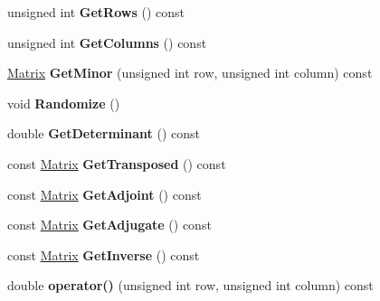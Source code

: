 \begin{DoxyCompactItemize}
\item 
\hypertarget{classdfv_1_1Matrix_a348f25a5ba52132128db9bd21d9edf7d}{unsigned int {\bfseries \-Get\-Rows} () const }\label{classdfv_1_1Matrix_a348f25a5ba52132128db9bd21d9edf7d}

\item 
\hypertarget{classdfv_1_1Matrix_aaf40c723521a5c12c87e238eedef22da}{unsigned int {\bfseries \-Get\-Columns} () const }\label{classdfv_1_1Matrix_aaf40c723521a5c12c87e238eedef22da}

\item 
\hypertarget{classdfv_1_1Matrix_a6d41ded1233ab2445bfac075fdddf831}{\hyperlink{classdfv_1_1Matrix}{\-Matrix} {\bfseries \-Get\-Minor} (unsigned int row, unsigned int column) const }\label{classdfv_1_1Matrix_a6d41ded1233ab2445bfac075fdddf831}

\item 
\hypertarget{classdfv_1_1Matrix_a13de1afb3cce2f2996323487b8d2a5af}{void {\bfseries \-Randomize} ()}\label{classdfv_1_1Matrix_a13de1afb3cce2f2996323487b8d2a5af}

\item 
\hypertarget{classdfv_1_1Matrix_a91ced62f8f1c042ad031ca8282d2abd8}{double {\bfseries \-Get\-Determinant} () const }\label{classdfv_1_1Matrix_a91ced62f8f1c042ad031ca8282d2abd8}

\item 
\hypertarget{classdfv_1_1Matrix_a1fcc2461164d91e0742c9685517a0a48}{const \hyperlink{classdfv_1_1Matrix}{\-Matrix} {\bfseries \-Get\-Transposed} () const }\label{classdfv_1_1Matrix_a1fcc2461164d91e0742c9685517a0a48}

\item 
\hypertarget{classdfv_1_1Matrix_ad3477aa854d8803dca2a943cc6629ba9}{const \hyperlink{classdfv_1_1Matrix}{\-Matrix} {\bfseries \-Get\-Adjoint} () const }\label{classdfv_1_1Matrix_ad3477aa854d8803dca2a943cc6629ba9}

\item 
\hypertarget{classdfv_1_1Matrix_a4c928f3296f66d4ac511cb95c3915cf8}{const \hyperlink{classdfv_1_1Matrix}{\-Matrix} {\bfseries \-Get\-Adjugate} () const }\label{classdfv_1_1Matrix_a4c928f3296f66d4ac511cb95c3915cf8}

\item 
\hypertarget{classdfv_1_1Matrix_a7937ed593017bb9f7ffe5ed5ea4279f8}{const \hyperlink{classdfv_1_1Matrix}{\-Matrix} {\bfseries \-Get\-Inverse} () const }\label{classdfv_1_1Matrix_a7937ed593017bb9f7ffe5ed5ea4279f8}

\item 
\hypertarget{classdfv_1_1Matrix_a7167e74a4fe7d178aaa794e00d96900a}{double {\bfseries operator()} (unsigned int row, unsigned int column) const }\label{classdfv_1_1Matrix_a7167e74a4fe7d178aaa794e00d96900a}

\end{DoxyCompactItemize}
